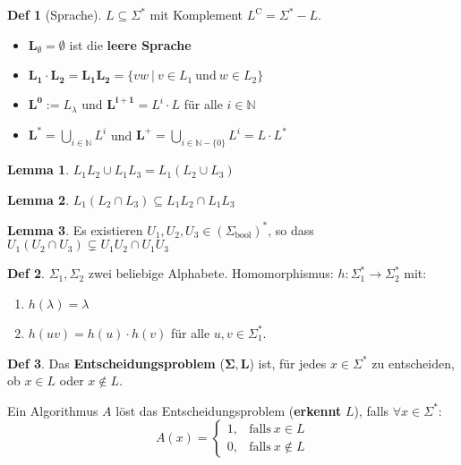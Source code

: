 \documentclass[a4paper, 10pt]{article}
\theoremstyle{definition}
\newtheorem{definition}{Def}[section]
\newtheorem{lemma}{Lemma}[section]
\newcommand{\N}{\mathbb{N}}
\newcommand{\words}{\Sigma^*}
\newcommand{\A}{\Sigma}
\begin{document}
\begin{definition}[Sprache]
    \(L \subseteq \words\) mit Komplement \(L^\text{C} = \words - L\).
    \begin{itemize}
        \item \(\bm{L_\emptyset} = \emptyset\) ist die \textbf{leere Sprache}
        \item \(\bm{L_1 \cdot L_2 = L_1 L_2} = \{vw \ | \ v \in L_1 \ \text{und} \ w \in L_2\}\)
        \item \(\bm{L^0} := L_\lambda\) und \(\bm{L^{i + 1}} = L^i \cdot L\) für alle \(i \in \N\)
        \item \(\bm{L^*} = \bigcup\limits_{i \in \N} L^i\) und \(\bm{L^+} = \bigcup\limits_{i \in \N - \{0\}} L^i = L \cdot L^*\)
    \end{itemize}
\end{definition}

\begin{lemma}
    \(L_1 L_2 \cup L_1 L_3 = L_1 (L_2 \cup L_3)\)
\end{lemma}

\begin{lemma}
    \(L_1 (L_2 \cap L_3) \subseteq L_1 L_2 \cap L_1 L_3\)
\end{lemma}

\begin{lemma}
    Es existieren \(U_1 , U_2, U_3 \in (\A_{\text{bool}})^*\), so dass \(U_1(U_2 \cap U_3) \subsetneq U_1 U_2 \cap U_1 U_3\)
\end{lemma}

\begin{definition}
    \(\A_1, \A_2\) zwei beliebige Alphabete. Homomorphismus: \(h : \A_1^* \to \A_2^*\) mit:
    \begin{enumerate}
        \item \(h(\lambda) = \lambda\)
        \item \(h(uv) = h(u) \cdot h(v)\) für alle \(u, v \in \words_1\).
    \end{enumerate} 
\end{definition}

\begin{definition}
    Das \textbf{Entscheidungsproblem} (\(\bm{\A, L}\)) ist, für jedes \(x \in \words\) zu entscheiden, ob \(x \in L\) oder \(x \not\in L\).

    Ein Algorithmus \(A\) löst das Entscheidungsproblem (\textbf{erkennt} \(L\)), falls \(\forall x \in \words\):
    \[A(x) = \begin{cases}
        1, & \text{falls} \ x \in L \\
        0, & \text{falls} \ x \not\in L
    \end{cases}\]
\end{definition}
\end{document}
